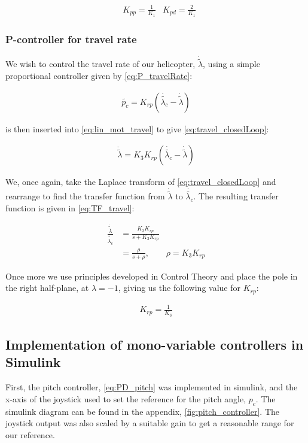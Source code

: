 \begin{align}\label{eq:K_ppK_pd}
    &K_{pp} = \frac{1}{K_1}   
    &K_{pd} = \frac{2}{K_1}
\end{align}


\subsubsection{P-controller for travel rate}
We wish to control the travel rate of our helicopter, $\dot{\tilde{\lambda}}$, using a simple proportional controller given by \cref{eq:P_travelRate}:

\begin{gather}\label{eq:P_travelRate}
    \tilde{p_c} = K_{rp}(\dot{\tilde{\lambda_c}} - \dot{\tilde{\lambda}})
\end{gather}

 is then inserted into \cref{eq:lin_mot_travel} to give \cref{eq:travel_closedLoop}:

\begin{gather}\label{eq:travel_closedLoop}
    \ddot{\tilde{\lambda}} = K_{3}K_{rp}(\dot{\tilde{\lambda_c}}  - \dot{\tilde{\lambda}})
\end{gather}

We, once again, take the Laplace transform of \cref{eq:travel_closedLoop} and rearrange to find the transfer function from $\dot{\tilde{\lambda}}$ to $\dot{\tilde{\lambda_c}}$. The resulting transfer function is given in \cref{eq:TF_travel}:


\begin{equation}\label{eq:TF_travel}
    \begin{aligned}
        \frac{\dot{\tilde{\lambda}}}{\dot{\tilde{\lambda_c}}} &= \frac{K_{3}K_{rp}}{s + K_{3}K_{rp}} \\
         &= \frac{\rho}{s + \rho},&\rho = K_{3}K_{rp}
    \end{aligned}
\end{equation}

Once more we use principles developed in Control Theory\cite{regtek} and place the pole in the right half-plane, at $\lambda = -1$, giving us the following value for $K_{rp}$:


\begin{gather}\label{eq:K_rp}
    K_{rp} = \frac{1}{K_3}
\end{gather}

\subsection{Implementation of mono-variable controllers in Simulink}
First, the pitch controller, \cref{eq:PD_pitch} was implemented in simulink, and the x-axis of the joystick used to set the reference for the pitch angle, $p_c$. The simulink diagram can be found in the appendix, \cref{fig:pitch_controller}. The joystick output was also scaled by a suitable gain to get a reasonable range for our reference.

